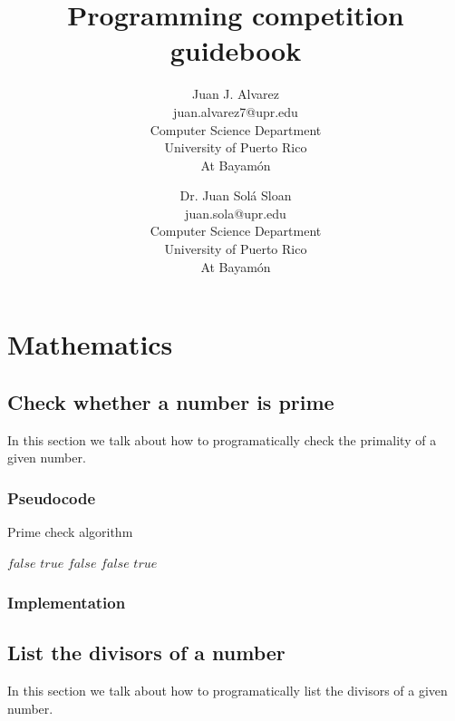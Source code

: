 \documentclass[letterpaper]{article}
\title{Programming competition guidebook}
\author{
  Juan J. Alvarez \\
  juan.alvarez7@upr.edu \\
  Computer Science Department \\
  University of Puerto Rico \\
  At Bayam\'{o}n \\
  \and
  Dr. Juan Sol\'{a} Sloan \\
  juan.sola@upr.edu \\
  Computer Science Department \\
  University of Puerto Rico \\
  At Bayam\'{o}n \\
}
\date{}
\begin{document}
  \maketitle

  \tableofcontents

  \newpage

  \section{Mathematics}

    \subsection{Check whether a number is prime}
      In this section we talk about how to programatically check the primality of a given number.

      \subsubsection{Pseudocode}
        \begin{algorithm}
          \caption{Prime check algorithm}
          \begin{algorithmic}[1]
                \Return $false$
              \EndIf
                \Return $true$
              \EndIf
                \Return $false$
              \EndIf
                  \Return $false$
                \EndIf
              \EndFor
              \Return $true$
            \EndProcedure
          \end{algorithmic}
        \end{algorithm}

      \subsubsection{Implementation}
        

    \subsection{List the divisors of a number}
      In this section we talk about how to programatically list the divisors of a given number.
\end{document}
